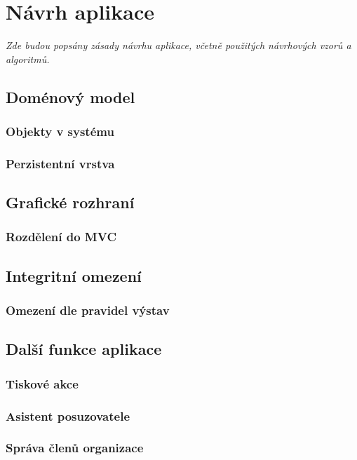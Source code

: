 \chapter{Návrh aplikace}
\textit{Zde budou popsány zásady návrhu aplikace, včetně použitých návrhových vzorů a algoritmů.}

\section{Doménový model}
\subsection{Objekty v systému}
\subsection{Perzistentní vrstva}

\section{Grafické rozhraní}
\subsection{Rozdělení do MVC}

\section{Integritní omezení}

\subsection{Omezení dle pravidel výstav}

\section{Další funkce aplikace}
\subsection{Tiskové akce}
\subsection{Asistent posuzovatele}
\subsection{Správa členů organizace}
